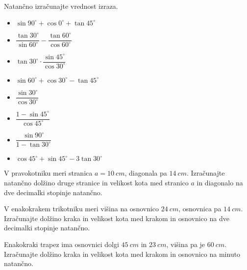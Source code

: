         


        
            \begin{naloga}
                Natančno izračunajte vrednost izraza.
                \begin{itemize}
                    
                            \item $\displaystyle \sin{90^\circ}+\cos{0^\circ}+\tan{45^\circ}$ 
                            \item $\displaystyle \dfrac{\tan{30^\circ}}{\sin{60^\circ}}-\dfrac{\tan{60^\circ}}{\cos{60^\circ}}$ 
                            \item $\displaystyle \tan{30^\circ}\cdot\dfrac{\sin{45^\circ}}{\cos{30^\circ}}$ 
                            \item $\displaystyle \sin{60^\circ}+\cos{30^\circ}-\tan{45^\circ}$ 
                            \item $\displaystyle \dfrac{\sin{30^\circ}}{\cos{30^\circ}}$ 
                            \item $\displaystyle \dfrac{1-\sin{45^\circ}}{\cos{45^\circ}}$ 
                            \item $\displaystyle \dfrac{\sin{90^\circ}}{1-\tan{30^\circ}}$ 
                            \item $\displaystyle \cos{45^\circ}+\sin{45^\circ}-3\tan{30^\circ}$ 
                    
                \end{itemize}
            \end{naloga}

        


        
            \begin{naloga}
                V pravokotniku meri stranica $a=10~cm$, diagonala pa $14~cm$.
                Izračunajte natančno dolžino druge stranice in velikost kota med stranico $a$ in diagonalo na dve decimalki stopinje natančno.
            \end{naloga}


            \begin{naloga}
                V enakokrakem trikotniku meri višina na osnovnico $24~cm$, osnovnica pa $14~cm$.
                Izračunajte dolžino kraka in velikost kota med krakom in osnovnico na dve decimalki stopinje natančno.
            \end{naloga}


            \begin{naloga}
                Enakokraki trapez ima osnovnici dolgi $45~cm$ in $23~cm$, višina pa je $60~cm$.
                Izračunajte dolžino kraka in velikost kota med krakom in osnovnico na minuto natančno.
            \end{naloga}

